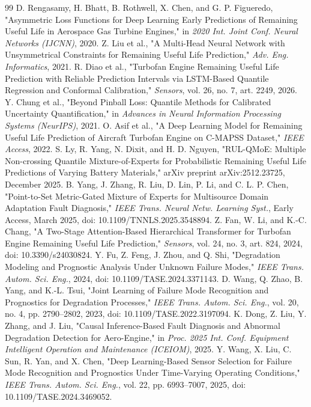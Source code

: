 \documentclass[preprint,10pt]{elsarticle}
\begin{document}
\begin{thebibliography}{99}
  D. Rengasamy, H. Bhatt, B. Rothwell, X. Chen, and G. P. Figueredo, "Asymmetric Loss Functions for Deep Learning Early Predictions of Remaining Useful Life in Aerospace Gas Turbine Engines," in \textit{2020 Int. Joint Conf. Neural Networks (IJCNN)}, 2020.
  Z. Liu et al., "A Multi-Head Neural Network with Unsymmetrical Constraints for Remaining Useful Life Prediction," \textit{Adv. Eng. Informatics}, 2021.
  R. Diao et al., "Turbofan Engine Remaining Useful Life Prediction with Reliable Prediction Intervals via LSTM-Based Quantile Regression and Conformal Calibration," \textit{Sensors}, vol. 26, no. 7, art. 2249, 2026.
  Y. Chung et al., "Beyond Pinball Loss: Quantile Methods for Calibrated Uncertainty Quantification," in \textit{Advances in Neural Information Processing Systems (NeurIPS)}, 2021.
  O. Asif et al., "A Deep Learning Model for Remaining Useful Life Prediction of Aircraft Turbofan Engine on C-MAPSS Dataset," \textit{IEEE Access}, 2022.
  S. Ly, R. Yang, N. Dixit, and H. D. Nguyen, "RUL-QMoE: Multiple Non-crossing Quantile Mixture-of-Experts for Probabilistic Remaining Useful Life Predictions of Varying Battery Materials," arXiv preprint arXiv:2512.23725, December 2025.
  B. Yang, J. Zhang, R. Liu, D. Lin, P. Li, and C. L. P. Chen, "Point-to-Set Metric-Gated Mixture of Experts for Multisource Domain Adaptation Fault Diagnosis," \textit{IEEE Trans. Neural Netw. Learning Syst.}, Early Access, March 2025, doi: 10.1109/TNNLS.2025.3548894.
  Z. Fan, W. Li, and K.-C. Chang, "A Two-Stage Attention-Based Hierarchical Transformer for Turbofan Engine Remaining Useful Life Prediction," \textit{Sensors}, vol. 24, no. 3, art. 824, 2024, doi: 10.3390/s24030824.
  Y. Fu, Z. Feng, J. Zhou, and Q. Shi, "Degradation Modeling and Prognostic Analysis Under Unknown Failure Modes," \textit{IEEE Trans. Autom. Sci. Eng.}, 2024, doi: 10.1109/TASE.2024.3371143.
  D. Wang, Q. Zhao, B. Yang, and K.-L. Tsui, "Joint Learning of Failure Mode Recognition and Prognostics for Degradation Processes," \textit{IEEE Trans. Autom. Sci. Eng.}, vol. 20, no. 4, pp. 2790--2802, 2023, doi: 10.1109/TASE.2022.3197094.
  K. Dong, Z. Liu, Y. Zhang, and J. Liu, "Causal Inference-Based Fault Diagnosis and Abnormal Degradation Detection for Aero-Engine," in \textit{Proc. 2025 Int. Conf. Equipment Intelligent Operation and Maintenance (ICEIOM)}, 2025.
  Y. Wang, X. Liu, C. Sun, R. Yan, and X. Chen, "Deep Learning-Based Sensor Selection for Failure Mode Recognition and Prognostics Under Time-Varying Operating Conditions," \textit{IEEE Trans. Autom. Sci. Eng.}, vol. 22, pp. 6993--7007, 2025, doi: 10.1109/TASE.2024.3469052.

\end{thebibliography}
\end{document}

